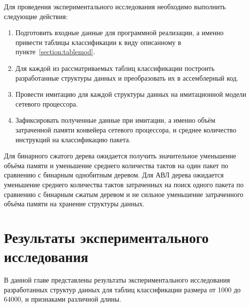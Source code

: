 \documentclass[9pt,a4paper]{article}
\begin{document}
            Для проведения экспериментального исследования необходимо выполнить следующие действия:
            \begin{enumerate}
                \item Подготовить входные данные для программной реализации, а именно привести таблицы классификации к виду описанному в пункте~\ref{section:tablemod}.
                \item Для каждой из рассматриваемых таблиц классификации построить разработанные структуры данных и преобразовать их в ассемблерный код.
                \item Провести имитацию для каждой структуры данных на имитационной модели сетевого процессора.
                \item Зафиксировать полученные данные при имитации, а именно объём затраченной памяти конвейера сетевого процессора, и среднее количество инструкций
                    на классификацию пакета.
            \end{enumerate}

            Для бинарного сжатого дерева ожидается получить значительное уменьшение объёма памяти и уменьшение среднего количества тактов на один пакет 
            по сравнению с бинарным однобитным деревом.
            Для АВЛ дерева ожидается уменьшение среднего количества тактов затраченных на поиск одного пакета по сравнению с бинарным сжатым деревом и 
            не сильное уменьшение затраченного объёма памяти на хранение структуры данных.
    \section{Результаты экспериментального исследования}
        В данной главе представлены результаты экспериментального исследования разработанных структур данных для таблиц классификации размера от 1000 до 64000, 
        и признаками различной длины.
\end{document}
